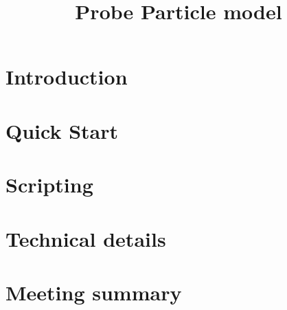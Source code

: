 \documentclass[english]{book}
\title{Probe Particle model}
\author{}
\begin{document}
\maketitle

\tableofcontents

\chapter{Introduction}
  

\chapter{Quick Start}


\chapter{Scripting}


\chapter{Technical details}


\chapter{Meeting summary}




\newpage



\end{document}
